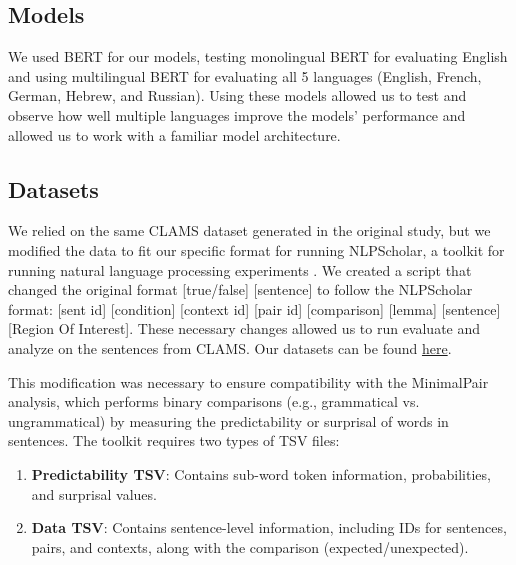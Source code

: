 \documentclass[11pt]{article}
\begin{document}
\subsection{Models}
We used BERT for our models, testing monolingual BERT for evaluating English and using multilingual BERT for evaluating all 5 languages (English, French, German, Hebrew, and Russian). Using these models allowed us to test and observe how well multiple languages improve the models' performance and allowed us to work with a familiar model architecture.

\subsection{Datasets}
We relied on the same CLAMS dataset generated in the original study, but we modified the data to fit our specific format for running NLPScholar, a toolkit for running natural language processing experiments \cite{prasad-davis-2024-training-nlp}. We created a script that changed the original format [true/false] [sentence] to follow the NLPScholar format: [sent id] [condition] [context id] [pair id] [comparison] [lemma] [sentence] [Region Of Interest]. These necessary changes allowed us to run evaluate and analyze on the sentences from CLAMS. Our datasets can be found \href{https://drive.google.com/drive/folders/1qSvXkoO3KI0APpjeOCd6oRJzvyi1ytJo?usp=sharing}{here}.

This modification was necessary to ensure compatibility with the MinimalPair analysis, which performs binary comparisons (e.g., grammatical vs. ungrammatical) by measuring the predictability or surprisal of words in sentences. The toolkit requires two types of TSV files:
\begin{enumerate}
    \item \textbf{Predictability TSV}: Contains sub-word token information, probabilities, and surprisal values.
    \item \textbf{Data TSV}: Contains sentence-level information, including IDs for sentences, pairs, and contexts, along with the comparison (expected/unexpected).
\end{enumerate}
\end{document}
